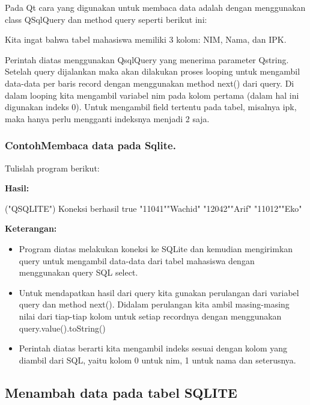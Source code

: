 Pada Qt cara yang digunakan untuk membaca data adalah dengan menggunakan
class QSqlQuery dan method query seperti berikut ini:



Kita ingat bahwa tabel mahasiswa memiliki 3 kolom: NIM, Nama, dan IPK.

Perintah diatas menggunakan QsqlQuery yang menerima parameter Qstring.
Setelah query dijalankan maka akan dilakukan proses looping untuk
mengambil data-data per baris record dengan menggunakan method next()
dari query. Di dalam looping kita mengambil variabel nim pada kolom
pertama (dalam hal ini digunakan indeks 0). Untuk mengambil field
tertentu pada tabel, misalnya ipk, maka hanya perlu mengganti indeksnya
menjadi 2 saja.

\subsubsection*{ContohMembaca data pada Sqlite.}

Tulislah program berikut:



\textbf{Hasil:}

\begin{lcverbatim}
("QSQLITE")
Koneksi berhasil
true
"11041""Wachid"
"12042""Arif"
"11012""Eko"
\end{lcverbatim}

\textbf{Keterangan:}

\begin{itemize}

\item
Program diatas melakukan koneksi ke SQLite dan kemudian mengirimkan
query untuk mengambil data-data dari tabel mahasiswa dengan
menggunakan query SQL select.
\item
Untuk mendapatkan hasil dari query kita gunakan perulangan dari
variabel query dan method next(). Didalam perulangan kita ambil
masing-masing nilai dari tiap-tiap kolom untuk setiap recordnya dengan
menggunakan query.value().toString()
\item
Perintah diatas berarti kita mengambil indeks sesuai dengan kolom yang
diambil dari SQL, yaitu kolom 0 untuk nim, 1 untuk nama dan
seterusnya.
\end{itemize}

\subsection{Menambah data pada tabel SQLITE}\label{menambah-data-pada-tabel-sqlite}

